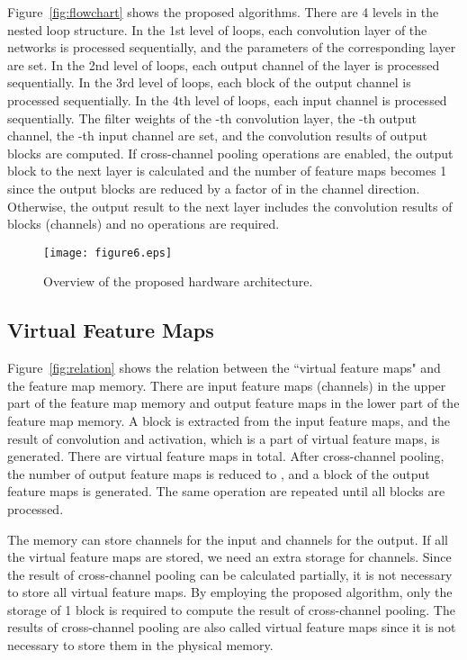 \documentclass[10pt,twocolumn,letterpaper]{article}
\begin{document}
Figure~\ref{fig:flowchart} shows the proposed algorithms. There are 4 levels in the nested loop structure. In the 1st level of loops, each convolution layer of the networks is processed sequentially, and the parameters of the corresponding layer are set. In the 2nd level of loops, each output channel of the layer is processed sequentially. In the 3rd level of loops, each block of the output channel is processed sequentially. In the 4th level of loops, each input channel is processed sequentially. The filter weights of the -th convolution layer, the -th output channel, the -th input channel are set, and the convolution results of  output blocks are computed. If cross-channel pooling operations are enabled, the output block to the next layer is calculated and the number of feature maps becomes 1 since the output blocks are reduced by a factor of  in the channel direction. Otherwise, the output result to the next layer includes the convolution results of  blocks (channels) and no operations are required.

\begin{figure*}[t]
\begin{center}
\texttt{[image: figure6.eps]}
\end{center}
   \caption{Overview of the proposed hardware architecture.}
\label{fig:architecture}
\end{figure*}


\subsection{Virtual Feature Maps}
\label{subsec:vitrual}

Figure~\ref{fig:relation} shows the relation between the ``virtual feature maps" and the feature map memory. There are  input feature maps (channels) in the upper part of the feature map memory and  output feature maps in the lower part of the feature map memory. A block is extracted from the input feature maps, and the result of convolution and activation, which is a part of virtual feature maps, is generated. There are  virtual feature maps in total. After cross-channel pooling, the number of output feature maps is reduced to , and a block of the output feature maps is generated. The same operation are repeated until all blocks are processed.

The memory can store  channels for the input and  channels for the output. If all the virtual feature maps are stored, we need an extra storage for  channels. Since the result of cross-channel pooling can be calculated partially, it is not necessary to store all virtual feature maps. By employing the proposed algorithm, only the storage of 1 block is required to compute the result of cross-channel pooling. The results of cross-channel pooling are also called virtual feature maps since it is not necessary to store them in the physical memory.
\end{document}
